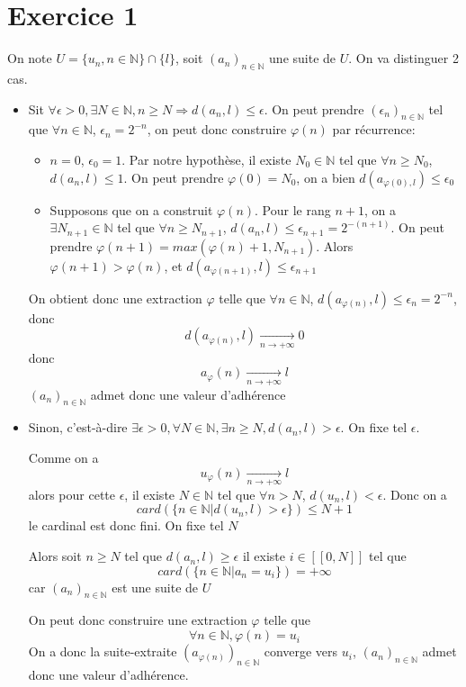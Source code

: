 \documentclass[a4paper,12pt]{book}
\begin{document}
\renewcommand{\labelitemi}{$\blacktriangleright$}
\renewcommand{\labelitemii}{$\bullet$}


\section{Exercice 1}
On note $U=\{u_n,n\in \mathbb{N}\} \cap \{l\}$, soit $(a_n)_{n \in \mathbb{N}}$ une suite de $U$. On va distinguer 2 cas.
\begin{itemize}
    \item Sit $\forall \epsilon>0, \exists N \in \mathbb{N}, n \geq N \Rightarrow d(a_n,l)\leq \epsilon$. On peut prendre $(\epsilon_n)_{n \in \mathbb{N}}$ tel que 
    $\forall n \in \mathbb{N}$, $\epsilon_n=2^{-n}$, on peut donc construire $\varphi(n)$ par récurrence:
    \begin{itemize}
        \item $n=0$, $\epsilon_0=1$. Par notre hypothèse, il existe $N_0 \in \mathbb{N}$ tel que $\forall n\geq N_0$, $d(a_n,l)\leq 1$. 
        On peut prendre $\varphi(0)=N_0$, on a bien $d(a_{\varphi(0),l})\leq \epsilon_0$
        \item Supposons que on a construit $\varphi(n)$. Pour le rang $n+1$, on a $\exists N_{n+1} \in \mathbb{N}$ tel que $\forall n \geq N_{n+1}$, $d(a_{n},l)\leq \epsilon_{n+1}=2^{-(n+1)}$. 
        On peut prendre $\varphi(n+1)=max(\varphi(n)+1,N_{n+1})$. Alors $\varphi(n+1)>\varphi(n)$, et $d(a_{\varphi(n+1)},l)\leq \epsilon_{n+1}$
    \end{itemize}
    On obtient donc une extraction $\varphi$ telle que $\forall n \in \mathbb{N}$, $d(a_{\varphi(n)},l)\leq \epsilon_n=2^{-n}$, donc
    $$
    d(a_{\varphi(n)},l)\xrightarrow[n \to +\infty]{}0 
    $$
    donc 
    $$
    a_\varphi(n)\xrightarrow[n \to +\infty]{}l   
    $$
    $(a_n)_{n \in \mathbb{N}}$ admet donc une valeur d'adhérence
    \item Sinon, c'est-à-dire $\exists \epsilon>0, \forall N \in \mathbb{N}, \exists n \geq N, d(a_n,l)> \epsilon$. On fixe tel $\epsilon$. 
    
    Comme on a 
    $$
    u_\varphi(n)\xrightarrow[n \to +\infty]{}l   
    $$
    alors pour cette $\epsilon$, il existe $N \in \mathbb{N}$ tel que $\forall n > N$, $d(u_n,l)< \epsilon$. Donc on a 
    $$
    card(\{n \in \mathbb{N}|d(u_n,l)>\epsilon\})\leq N+1
    $$
    le cardinal est donc fini. On fixe tel $N$

    Alors soit $n \geq N$ tel que $d(a_n,l) \geq \epsilon$  il existe $i \in [\![0,N]\!]$ tel que 
    $$
    card(\{n \in \mathbb{N}|a_n=u_i\})=+\infty
    $$
    car $(a_n)_{n \in \mathbb{N}}$ est une suite de $U$

    On peut donc construire une extraction $\varphi$ telle que 
    $$
    \forall n \in \mathbb{N}, \varphi(n)=u_i
    $$ 
    On a donc la suite-extraite  $(a_{\varphi(n)})_{n \in \mathbb{N}}$ converge vers $u_i$, $(a_n)_{n \in \mathbb{N}}$ admet donc une valeur d'adhérence. 
\end{itemize}
\end{document}
